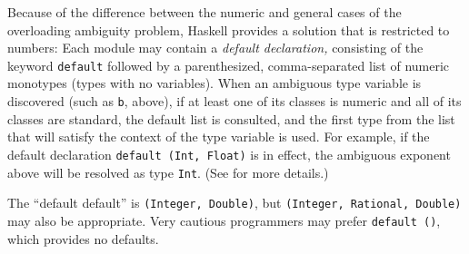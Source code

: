 Because of the difference between the numeric and general cases of the
overloading ambiguity problem, Haskell provides a solution that is
restricted to numbers: Each module may contain a {\em default
declaration,} consisting of the keyword \mbox{\tt default} followed by a
parenthesized, comma-separated list of numeric monotypes (types with
no variables).  When an ambiguous type variable is discovered (such as
\mbox{\tt b}, above), if at least one of its classes is numeric and all of its
classes are standard, the default list is consulted, and the first
type from the list that will satisfy the context of the type variable
is used.  For example, if the default declaration
\mbox{\tt default\ (Int,\ Float)} is in effect, the ambiguous exponent above will
be resolved as type \mbox{\tt Int}.  (See  for more details.)

The ``default default'' is \mbox{\tt (Integer,\ Double)}, but
\mbox{\tt (Integer,\ Rational,\ Double)} may also be appropriate.  Very cautious
programmers may prefer \mbox{\tt default\ ()}, which provides no defaults.

